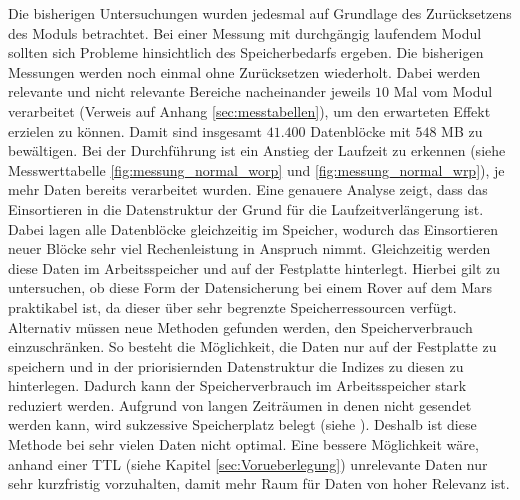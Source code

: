 Die bisherigen Untersuchungen wurden jedesmal auf Grundlage des Zurücksetzens
des Moduls betrachtet. Bei einer Messung mit durchgängig laufendem Modul sollten
sich Probleme hinsichtlich des Speicherbedarfs ergeben.
\newline
Die bisherigen Messungen werden noch einmal ohne Zurücksetzen wiederholt. Dabei
werden relevante und nicht relevante Bereiche nacheinander jeweils $10$ Mal vom
Modul verarbeitet (Verweis auf Anhang \ref{sec:messtabellen}), um den
erwarteten Effekt erzielen zu können. Damit sind insgesamt $41.400$ Datenblöcke
mit $548$ MB zu bewältigen.
\newline
Bei der Durchführung ist ein Anstieg der Laufzeit zu erkennen (siehe
Messwerttabelle \ref{fig:messung_normal_worp} und \ref{fig:messung_normal_wrp}),
je mehr Daten bereits verarbeitet wurden. Eine genauere Analyse zeigt, dass das
Einsortieren in die Datenstruktur  der Grund für die
Laufzeitverlängerung ist.
Dabei lagen alle Datenblöcke gleichzeitig im Speicher, wodurch das
Einsortieren neuer Blöcke sehr viel Rechenleistung in Anspruch nimmt.
Gleichzeitig werden diese Daten im Arbeitsspeicher und auf der Festplatte
hinterlegt. Hierbei gilt zu untersuchen, ob diese Form der Datensicherung bei
einem Rover auf dem Mars praktikabel ist, da dieser über sehr begrenzte
Speicherressourcen verfügt. Alternativ müssen neue Methoden gefunden werden, den
Speicherverbrauch einzuschränken. So besteht die Möglichkeit, die Daten nur auf
der Festplatte zu speichern und in der priorisiernden Datenstruktur die Indizes
zu diesen zu hinterlegen. Dadurch kann der Speicherverbrauch im Arbeitsspeicher
stark reduziert werden. Aufgrund von langen Zeiträumen in denen nicht gesendet
werden kann, wird sukzessive Speicherplatz belegt (siehe ).
Deshalb ist diese Methode bei sehr vielen Daten nicht optimal. Eine bessere Möglichkeit wäre, anhand einer
\gls{TTL} (siehe Kapitel \ref{sec:Vorueberlegung}) unrelevante Daten nur sehr
kurzfristig vorzuhalten, damit mehr Raum für Daten von hoher Relevanz ist.



 


